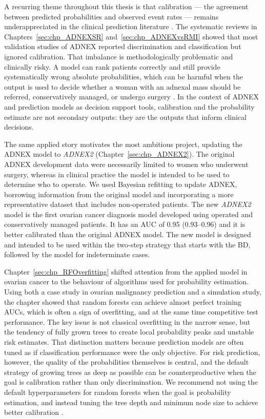 A recurring theme throughout this thesis is that calibration --- the agreement between predicted probabilities and observed event rates --- remains underappreciated in the clinical prediction literature \cite{vancalsterCalibrationAchillesHeel2019}. The systematic reviews in Chapters~\ref{sec:chp_ADNEXSR} and~\ref{sec:chp_ADNEXvsRMI} showed that most validation studies of \gls{ADNEX} reported discrimination and classification but ignored calibration. That imbalance is methodologically problematic and clinically risky. A model can rank patients correctly and still provide systematically wrong absolute probabilities, which can be harmful when the output is used to decide whether a woman with an adnexal mass should be referred, conservatively managed, or undergo surgery \cite{vancalsterCalibrationRiskPrediction2015}. In the context of \gls{ADNEX} and prediction models as decision support tools, calibration and the probability estimate are not secondary outputs: they are the outputs that inform clinical decisions.

The same applied story motivates the most ambitious project, updating the ADNEX model to \emph{ADNEX2} (Chapter~\ref{sec:chp_ADNEX2}). The original \gls{ADNEX} development data were necessarily limited to women who underwent surgery, whereas in clinical practice the model is intended to be used to determine who to operate. We used Bayesian refitting to update \gls{ADNEX}, borrowing information from the original model and incorporating a more representative dataset that includes non-operated patients. The new \emph{ADNEX2} model is the first ovarian cancer diagnosis model developed using operated and conservatively managed patients. It has an AUC of 0.95 (0.93--0.96)  and it is better calibrated than the original ADNEX model. The new model is designed and intended to be used within the two-step strategy that starts with the \gls{BD}, followed by the model for indeterminate cases. 

Chapter~\ref{sec:chp_RFOverfitting} shifted attention from the applied model in ovarian cancer to the behaviour of algorithms used for probability estimation. Using both a case study in ovarian malignancy prediction and a simulation study, the chapter showed that random forests can achieve almost perfect training \gls{AUC}s, which is often a sign of overfitting, and at the same time competitive test performance. The key issue is not classical overfitting in the narrow sense, but the tendency of fully grown trees to create local probability peaks and unstable risk estimates. That distinction matters because prediction models are often tuned as if classification performance were the only objective. For risk prediction, however, the quality of the probabilities themselves is central, and the default strategy of growing trees as deep as possible can be counterproductive when the goal is calibration rather than only discrimination. We recommend not using the default hyperparameters for random forests when the goal is probability estimation, and instead tuning the tree depth and minimum node size to achieve better calibration \cite{barrenadaUnderstandingOverfittingRandom2024}.

